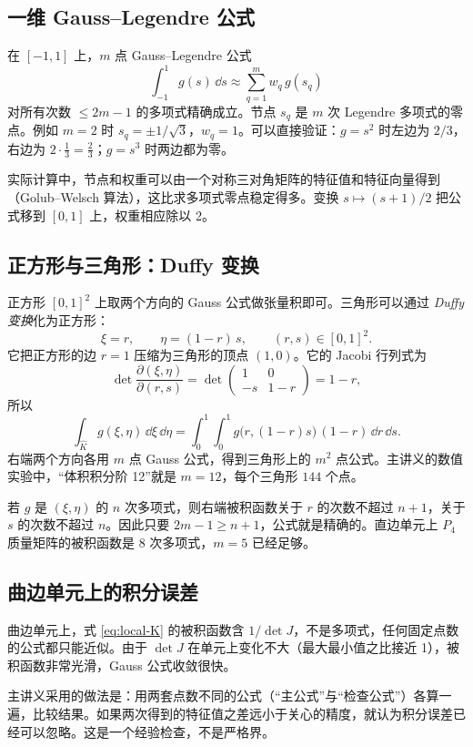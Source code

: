 \documentclass[11pt,a4paper,fontset=fandol]{ctexart}
\begin{document}
\subsection{一维 Gauss--Legendre 公式}

在 $[-1,1]$ 上，$m$ 点 Gauss--Legendre 公式
\[
\int_{-1}^1 g(s)\,\dd s\approx\sum_{q=1}^m w_q\,g(s_q)
\]
对所有次数 $\le 2m-1$ 的多项式精确成立。节点 $s_q$ 是 $m$ 次 Legendre 多项式的零点。例如 $m=2$ 时 $s_q=\pm1/\sqrt3$，$w_q=1$。可以直接验证：$g=s^2$ 时左边为 $2/3$，右边为 $2\cdot\frac13=\frac23$；$g=s^3$ 时两边都为零。

实际计算中，节点和权重可以由一个对称三对角矩阵的特征值和特征向量得到（Golub--Welsch 算法），这比求多项式零点稳定得多。变换 $s\mapsto(s+1)/2$ 把公式移到 $[0,1]$ 上，权重相应除以 2。

\subsection{正方形与三角形：Duffy 变换}

正方形 $[0,1]^2$ 上取两个方向的 Gauss 公式做张量积即可。三角形可以通过 \emph{Duffy 变换}化为正方形：
\[
\xi=r,\qquad \eta=(1-r)\,s,\qquad (r,s)\in[0,1]^2 .
\]
它把正方形的边 $r=1$ 压缩为三角形的顶点 $(1,0)$。它的 Jacobi 行列式为
\[
\det\frac{\partial(\xi,\eta)}{\partial(r,s)}=\det\begin{pmatrix}1&0\\-s&1-r\end{pmatrix}=1-r ,
\]
所以
\[
\int_{\widehat K}g(\xi,\eta)\,\dd\xi\,\dd\eta=\int_0^1\!\!\int_0^1 g\bigl(r,(1-r)s\bigr)\,(1-r)\,\dd r\,\dd s .
\]
右端两个方向各用 $m$ 点 Gauss 公式，得到三角形上的 $m^2$ 点公式。主讲义的数值实验中，“体积积分阶 12”就是 $m=12$，每个三角形 $144$ 个点。

若 $g$ 是 $(\xi,\eta)$ 的 $n$ 次多项式，则右端被积函数关于 $r$ 的次数不超过 $n+1$，关于 $s$ 的次数不超过 $n$。因此只要 $2m-1\ge n+1$，公式就是精确的。直边单元上 $P_4$ 质量矩阵的被积函数是 $8$ 次多项式，$m=5$ 已经足够。

\subsection{曲边单元上的积分误差}

曲边单元上，式 \eqref{eq:local-K} 的被积函数含 $1/\det J$，不是多项式，任何固定点数的公式都只能近似。由于 $\det J$ 在单元上变化不大（最大最小值之比接近 1），被积函数非常光滑，Gauss 公式收敛很快。

主讲义采用的做法是：用两套点数不同的公式（“主公式”与“检查公式”）各算一遍，比较结果。如果两次得到的特征值之差远小于关心的精度，就认为积分误差已经可以忽略。这是一个经验检查，不是严格界。
\end{document}
